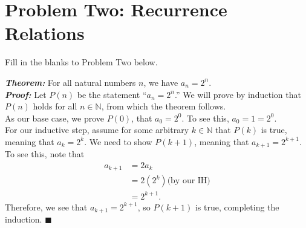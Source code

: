 \documentclass{article}
\renewcommand{\(}{\left(}
\renewcommand{\)}{\right)}
\renewcommand\qedsymbol{$\blacksquare$}
\renewcommand{\emph}[1]{\textit{\textbf{#1}}}
\theoremstyle{plain}
\theoremstyle{plain}
\theoremstyle{definition}
\begin{document}
\begin{shaded}
        \vspace{4mm}


        \vspace{4mm}

    \end{shaded}

\newpage

\section*{Problem Two: Recurrence Relations}
Fill in the blanks to Problem Two below.

 \begin{center}
        \begin{boxedminipage}{0.9\textwidth}
            \emph{Theorem:} For all natural numbers $n$, we have $a_n = 2^n$.
            \\ \emph{Proof: } Let $P(n)$ be the statement ``$a_n = 2^n$.'' We will prove by induction that $P(n)$ holds for all $n \in \mathbb{N}$, from which the theorem follows. \\ As our base case, we prove $P(0)$, that $a_{0}=2^{0}$. To see this, $a_{0}=1=2^{0}$. \\ For our inductive step, assume for some arbitrary $k \in \mathbb{N}$ that $P(k)$ is true, meaning that $a_{k}=2^{k}$. We need to show $P(k+1)$, meaning that $a_{k+1}=2^{k+1}$. To see this, note that 
            \begin{equation*}
                \begin{split}
                    a_{k+1} &= 2a_{k} \\
                       &= 2(2^{k}) \text{(by our IH)}\\
                       &= 2^{k+1}.
                \end{split}
            \end{equation*}
            Therefore, we see that $a_{k+1}=2^{k+1}$, so $P(k+1)$ is true, completing the induction. \qedsymbol
         \end{boxedminipage}
\end{center}
\end{document}
